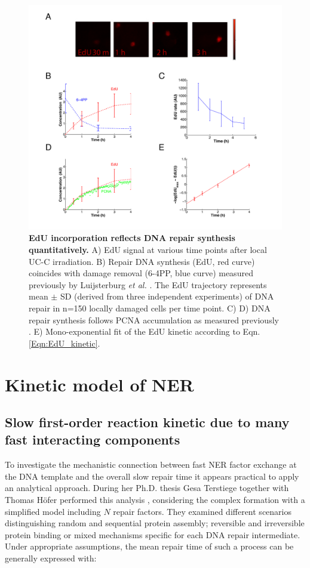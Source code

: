 \begin{figure}[b!]
\begin{center}
\includegraphics[width=1\textwidth]{Abbildungen/figure2_4.pdf}
\caption{\textbf{EdU incorporation reflects DNA repair synthesis quantitatively.} A) EdU signal at various time points after local UC-C irradiation. B) Repair DNA synthesis (EdU, red curve) coincides with damage removal (6-4PP, blue curve) measured previously by Luijsterburg \textit{et al.} \cite{Luijsterburg2010}. The EdU trajectory represents mean $\pm$ SD (derived from three independent experiments) of DNA repair in n=150 locally damaged cells per time point. C) D) DNA repair synthesis follows PCNA accumulation as measured previously \cite{Luijsterburg2010}. E) Mono-exponential fit of the EdU kinetic according to Eqn. \ref{Eqn:EdU_kinetic}.}
\label{fig:DNArepairKinetic}
\end{center}
\end{figure}

\section{Kinetic model of NER}
\subsection{Slow first-order reaction kinetic due to many fast interacting components}
\label{sec:toyModel}
To investigate the mechanistic connection between fast NER factor exchange at the DNA template and the overall slow repair time it appears practical to apply an analytical approach. During her Ph.D. thesis Gesa Terstiege together with Thomas H\"ofer performed this analysis \cite{Terstiege2010,Verbruggen2014}, considering the complex formation with a simplified model including $N$ repair factors. They examined different scenarios distinguishing random and sequential protein assembly; reversible and irreversible protein binding or mixed mechanisms specific for each DNA repair intermediate. Under appropriate assumptions, the mean repair time of such a process can be generally expressed with:

